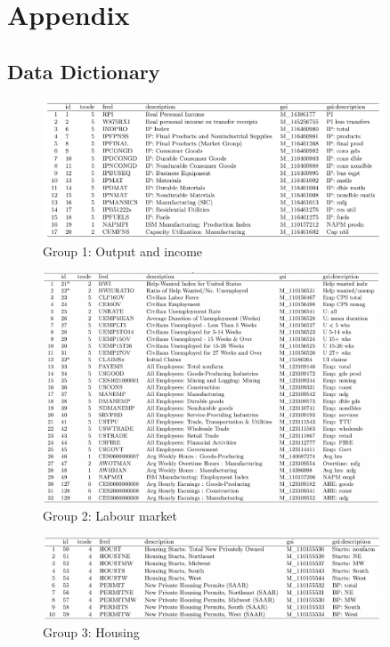 \clearpage 

\nocite{*}
\printbibliography

\clearpage

\section*{Appendix}

\subsection*{Data Dictionary}
\begin{figure}[h!]
        \centering
        \caption*{Group 1: Output and income}
        \includegraphics[width=0.9\textwidth]{figures/G1.png}
\end{figure}

\begin{figure}
        \centering
        \caption*{Group 2: Labour market}
        \includegraphics[width=0.9\textwidth]{figures/G2.png}
\end{figure}

\begin{figure}
        \centering
        \caption*{Group 3: Housing}
        \includegraphics[width=0.9\textwidth]{figures/G3.png}
\end{figure}

